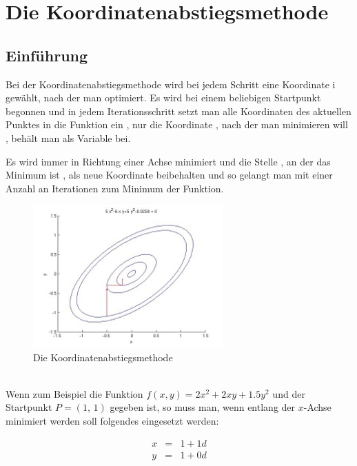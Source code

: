 \documentclass[naustrian]{article}
\begin{document}
{\begin{enumerate}
\end{enumerate}


\section{Die Koordinatenabstiegsmethode}

\subsection{Einführung}

Bei der Koordinatenabstiegsmethode wird bei jedem Schritt eine Koordinate
i gewählt, nach der man optimiert. Es wird bei einem beliebigen Startpunkt
begonnen und in jedem Iterationsschritt setzt man alle Koordinaten
des aktuellen Punktes in die Funktion ein , nur die Koordinate , nach
der man minimieren will , behält man als Variable bei.

Es wird immer in Richtung einer Achse minimiert und die Stelle , an
der das Minimum ist , als neue Koordinate beibehalten und so gelangt
man mit einer Anzahl an Iterationen zum Minimum der Funktion.

\begin{figure}[H]
    \centering
    \includegraphics[width=0.65\textwidth]{coord_desc/Coordinate_descent}
    \caption{Die Koordinatenabstiegsmethode}
\end{figure}

~\\
Wenn zum Beispiel die Funktion $f(x,y)=2x^{2}+2xy+1.5y^{2}$ und der
Startpunkt $P=(1,\,1)$ gegeben ist, so muss man, wenn entlang der
$x$-Achse minimiert werden soll folgendes eingesetzt werden:

\begin{eqnarray*}
    x & = & 1+1d\\
    y & = & 1+0d
\end{eqnarray*}


}
\end{document}
